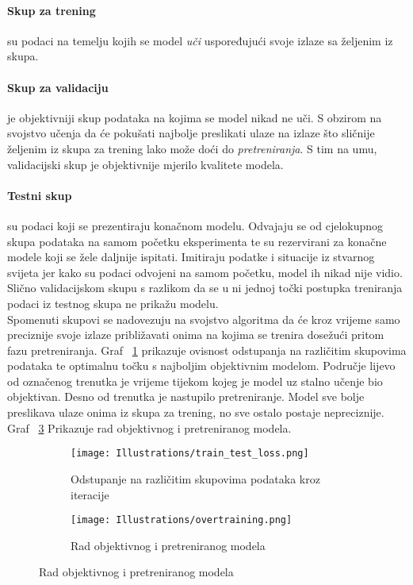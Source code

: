 \paragraph{Skup za trening}
su podaci na temelju kojih se model \emph{uči} uspoređujući svoje izlaze sa željenim iz skupa.

\paragraph{Skup za validaciju} 
je objektivniji skup podataka na kojima se model nikad ne uči.
S obzirom na svojstvo učenja da će pokušati najbolje preslikati ulaze na izlaze što sličnije željenim iz skupa za trening lako može doći do \emph{pretreniranja}.
S tim na umu, validacijski skup je objektivnije mjerilo kvalitete modela.

\paragraph{Testni skup}
su podaci koji se prezentiraju konačnom modelu.
Odvajaju se od cjelokupnog skupa podataka na samom početku eksperimenta te su rezervirani za konačne modele koji se žele daljnije ispitati.
Imitiraju podatke i situacije iz stvarnog svijeta jer kako su podaci odvojeni na samom početku, model ih nikad nije vidio.
Slično validacijskom skupu s razlikom da se u ni jednoj točki postupka treniranja podaci iz testnog skupa ne prikažu modelu. \\

Spomenuti skupovi se nadovezuju na svojstvo algoritma da će kroz vrijeme samo preciznije svoje izlaze približavati onima na kojima se trenira dosežući pritom fazu pretreniranja.
Graf ~\ref{fig:train_test_loss} prikazuje ovisnost odstupanja na različitim skupovima podataka te optimalnu točku s najboljim objektivnim modelom.
Područje lijevo od označenog trenutka je vrijeme tijekom kojeg je model uz stalno učenje bio objektivan. 
Desno od trenutka je nastupilo pretreniranje.
Model sve bolje preslikava ulaze onima iz skupa za trening, no sve ostalo postaje nepreciznije.
Graf ~\ref{fig:overfitting} Prikazuje rad objektivnog i pretreniranog modela.

\begin{figure}
	\caption{Grafički prikaz odstupanja kroz iteracije na trening i validacijskom skupu podataka te prikaz rada pretreniranog modela}
	\begin{subfigure}[t]{0.48\textwidth}
		\texttt{[image: Illustrations/train\_test\_loss.png]}
		\caption{Odstupanje na različitim skupovima podataka kroz iteracije}
		\label{fig:train_test_loss}
	\end{subfigure}
	\hspace{\fill}
	\begin{subfigure}[t]{0.48\textwidth}
		\texttt{[image: Illustrations/overtraining.png]}
		\caption{Rad objektivnog i pretreniranog modela}
		\label{fig:overfitting}
	\end{subfigure}
\end{figure}

